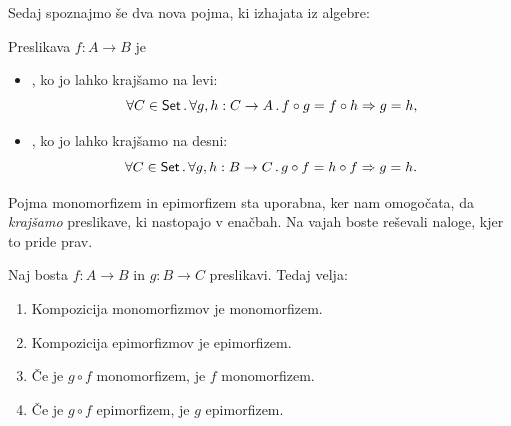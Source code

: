 Sedaj spoznajmo še dva nova pojma, ki izhajata iz algebre:

\begin{definicija}
  \label{def:monomorfizem-epimorfizem}
  Preslikava $f : A \to B$ je
  \begin{itemize}
  \item {}, ko jo lahko krajšamo na levi:
    \begin{equation*}
      \forall C \in \mathsf{Set} \,.\, \forall g, h : C \to A \,.\, f \circ g = f \circ h \Rightarrow g = h,
    \end{equation*}
  \item {}, ko jo lahko krajšamo na desni:
    \begin{equation*}
      \forall C \in \mathsf{Set} \,.\, \forall g, h : B \to C \,.\, g \circ f = h \circ f \Rightarrow g = h.
    \end{equation*}
  \end{itemize}
\end{definicija}

Pojma monomorfizem in epimorfizem sta uporabna, ker nam omogočata, da \emph{krajšamo} preslikave, ki nastopajo v enačbah. Na vajah boste reševali naloge, kjer to pride prav.

\begin{izrek}
  \label{izr:epi-mono-comp}
  Naj bosta $f : A \to B$ in $g : B \to C$ preslikavi. Tedaj velja:
  \begin{enumerate}
  \item Kompozicija monomorfizmov je monomorfizem.
  \item Kompozicija epimorfizmov je epimorfizem.
  \item Če je $g \circ f$ monomorfizem, je $f$ monomorfizem.
  \item Če je $g \circ f$ epimorfizem, je $g$ epimorfizem.
  \end{enumerate}
\end{izrek}

